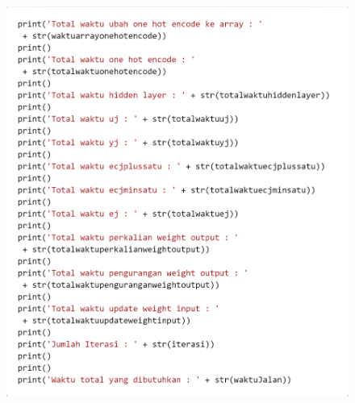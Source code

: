 \documentclass[12pt]{report}
\begin{document}
\begin{figure}[H]
\centering
\includegraphics[scale=0.3]{training7}
\end{figure}
\end{document}
